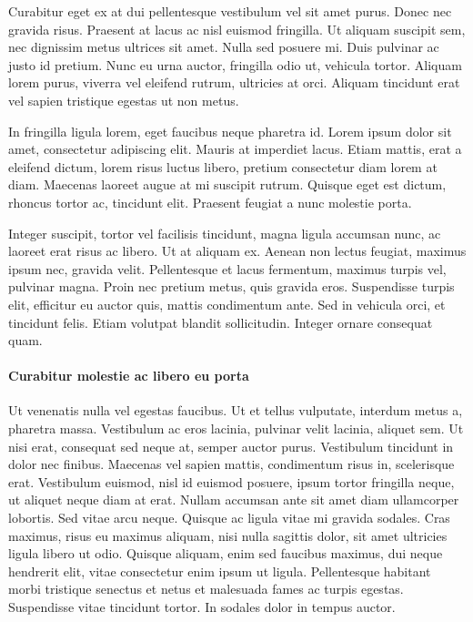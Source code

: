 Curabitur eget ex at dui pellentesque vestibulum vel sit amet purus. Donec nec gravida risus. Praesent at lacus ac nisl euismod fringilla. Ut aliquam suscipit sem, nec dignissim metus ultrices sit amet. Nulla sed posuere mi. Duis pulvinar ac justo id pretium. Nunc eu urna auctor, fringilla odio ut, vehicula tortor. Aliquam lorem purus, viverra vel eleifend rutrum, ultricies at orci. Aliquam tincidunt erat vel sapien tristique egestas ut non metus.

In fringilla ligula lorem, eget faucibus neque pharetra id. Lorem ipsum dolor sit amet, consectetur adipiscing elit. Mauris at imperdiet lacus. Etiam mattis, erat a eleifend dictum, lorem risus luctus libero, pretium consectetur diam lorem at diam. Maecenas laoreet augue at mi suscipit rutrum. Quisque eget est dictum, rhoncus tortor ac, tincidunt elit. Praesent feugiat a nunc molestie porta.

Integer suscipit, tortor vel facilisis tincidunt, magna ligula accumsan nunc, ac laoreet erat risus ac libero. Ut at aliquam ex. Aenean non lectus feugiat, maximus ipsum nec, gravida velit. Pellentesque et lacus fermentum, maximus turpis vel, pulvinar magna. Proin nec pretium metus, quis gravida eros. Suspendisse turpis elit, efficitur eu auctor quis, mattis condimentum ante. Sed in vehicula orci, et tincidunt felis. Etiam volutpat blandit sollicitudin. Integer ornare consequat quam.

\paragraph{Curabitur molestie ac libero eu porta} Ut venenatis nulla vel egestas faucibus. Ut et tellus vulputate, interdum metus a, pharetra massa. Vestibulum ac eros lacinia, pulvinar velit lacinia, aliquet sem. Ut nisi erat, consequat sed neque at, semper auctor purus. Vestibulum tincidunt in dolor nec finibus. Maecenas vel sapien mattis, condimentum risus in, scelerisque erat. Vestibulum euismod, nisl id euismod posuere, ipsum tortor fringilla neque, ut aliquet neque diam at erat. Nullam accumsan ante sit amet diam ullamcorper lobortis. Sed vitae arcu neque. Quisque ac ligula vitae mi gravida sodales. Cras maximus, risus eu maximus aliquam, nisi nulla sagittis dolor, sit amet ultricies ligula libero ut odio. Quisque aliquam, enim sed faucibus maximus, dui neque hendrerit elit, vitae consectetur enim ipsum ut ligula. Pellentesque habitant morbi tristique senectus et netus et malesuada fames ac turpis egestas. Suspendisse vitae tincidunt tortor. In sodales dolor in tempus auctor. 
